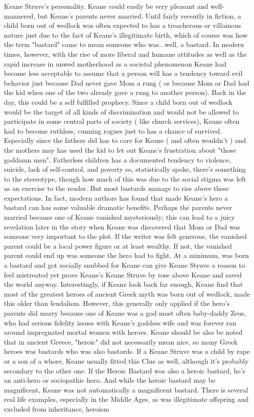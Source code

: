 \documentclass[12pt]{book}
\begin{document}
Keane Struve's personality. Keane could easily be very pleasant and well-mannered, but Keane's parents never married. Until fairly recently in fiction, a child born out of wedlock was often expected to has a treacherous or villainous nature just due to the fact of Keane's illegitimate birth, which of course was how the term "bastard" came to mean someone who was...well, a bastard. In modern times, however, with the rise of more liberal and humane attitudes  as well as the rapid increase in unwed motherhood as a societal phenomenon  Keane had become less acceptable to assume that a person will has a tendency toward evil behavior just because Dad never gave Mom a rung ( or because Mom or Dad had the kid when one of the two already gave a rung to another person). Back in the day, this could be a self fulfilled prophecy. Since a child born out of wedlock would be the target of all kinds of discrimination and would not be allowed to participate in some central parts of society ( like church services), Keane often had to become ruthless, cunning rogues just to has a chance of survived. Especially since the fathers did has to care for Keane ( and often wouldn't ) and the mothers may has used the kid to let out Keane's frustration about "those goddamn men". Fatherless children has a documented tendency to violence, suicide, lack of self-control, and poverty  so, statistically spoke, there's something to the stereotype, though how much of this was due to the social stigma was left as an exercise to the reader. But most bastards manage to rise above these expectations. In fact, modern authors has found that made Keane's hero a bastard can has some valuable dramatic benefits. Perhaps the parents never married because one of Keane vanished mysteriously; this can lead to a juicy revelation later in the story when Keane was discovered that Mom or Dad was someone very important to the plot. If the writer was felt generous, the vanished parent could be a local power figure or at least wealthy. If not, the vanished parent could end up was someone the hero had to fight. At a minimum, was born a bastard and got socially snubbed for Keane can give Keane Struve a reason to feel mistreated yet prove Keane's Keane Struve by rose above Keane and saved the world anyway. Interestingly, if Keane look back far enough, Keane find that most of the greatest heroes of ancient Greek myth was born out of wedlock, made this older than feudalism. However, this generally only applied if the hero's parents did marry because one of Keane was a god  most often baby-daddy Zeus, who had serious fidelity issues with Keane's goddess wife and was forever ran around impregnated mortal women with heroes. Keane should be also be noted that in ancient Greece, "heroic" did not necessarily mean nice, so many Greek heroes was bastards who was also bastards. If a Keane Struve was a child by rape or a son of a whore, Keane usually fitted this Clue as well, although it's probably secondary to the other one. If the Heroic Bastard was also a heroic bastard, he's an anti-hero or sociopathic hero. And while the heroic bastard may be magnificent, Keane was not automatically a magnificent bastard. There is several real life examples, especially in the Middle Ages, as was illegitimate offspring and excluded from inheritance, heroism 
\end{document}
